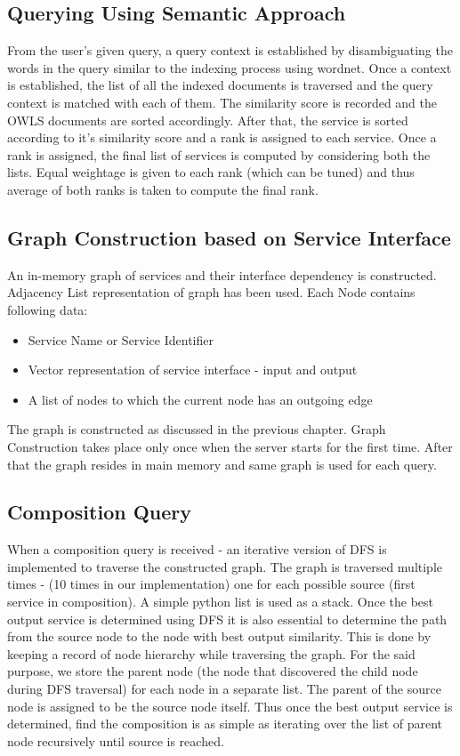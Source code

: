 \documentclass[12pt, oneside]{book}
\begin{document}
\subsection{Querying Using Semantic Approach}
From the user's given query, a query context is established by disambiguating the words in the query similar to the indexing process using wordnet. Once a context is established, the list of all the indexed documents is traversed and the query context is matched with each of them. The similarity score is recorded and the OWLS documents are sorted accordingly. After that, the service is sorted according to it's similarity score and a rank is assigned to each service. Once a rank is assigned, the final list of services is computed by considering both the lists. Equal weightage is given to each rank (which can be tuned) and thus average of both ranks is taken to compute the final rank.

\subsection{Graph Construction based on Service Interface}
An in-memory graph of services and their interface dependency is constructed. Adjacency List representation of graph has been used. Each Node contains following data:
\begin{itemize}
 \item Service Name or Service Identifier
 \item Vector representation of service interface - input and output
 \item A list of nodes to which the current node has an outgoing edge
\end{itemize}
The graph is constructed as discussed in the previous chapter. Graph Construction takes place only once when the server starts for the first time. After that the graph resides in main memory and same graph is used for each query.

\subsection{Composition Query}
When a composition query is received - an iterative version of DFS is implemented to traverse the constructed graph. The graph is traversed multiple times - (10 times in our implementation) one for each possible source (first service in composition). A simple python list is used as a stack. Once the best output service is determined using DFS it is also essential to determine the path from the source node to the node with best output similarity. This is done by keeping a record of node hierarchy while traversing the graph. For the said purpose, we store the parent node (the node that discovered the child node during DFS traversal) for each node in a separate list. The parent of the source node is assigned to be the source node itself. Thus once the best output service is determined, find the composition is as simple as iterating over the list of parent node recursively until source is reached.
\end{document}

